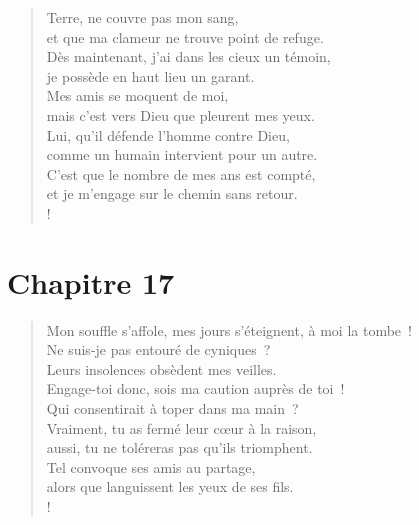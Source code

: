 \documentclass[french,twoside]{book} %
\def\mednobreak{\ifdim\lastskip<\medskipamount
  \removelastskip\nopagebreak\medskip\fi}
\newcommand{\labelblock}[1]{\medbreak{\noindent\color{rubric}\bfseries #1}\par\mednobreak}
\newcommand\chapteropen{} %
\newcommand\chaptercont{} %
\newcommand\chapterclose{} %
\begin{document}
\begin{verse}
Terre, ne couvre pas mon sang, \\
et que ma clameur ne trouve point de refuge.\\
Dès maintenant, j’ai dans les cieux un témoin, \\
je possède en haut lieu un garant.\\
Mes amis se moquent de moi, \\
mais c’est vers Dieu que pleurent mes yeux.\\
Lui, qu’il défende l’homme contre Dieu, \\
comme un humain intervient pour un autre.\\
C’est que le nombre de mes ans est compté, \\
et je m’engage sur le chemin sans retour.\\!
\end{verse}
\chapterclose


\chapteropen
\chapter[Chapitre 17]{Chapitre 17}\renewcommand{\leftmark}{Chapitre 17}


\chaptercont

\begin{verse}
Mon souffle s’affole, mes jours s’éteignent, à moi la tombe !\\
Ne suis-je pas entouré de cyniques ? \\
Leurs insolences obsèdent mes veilles.\\
Engage-toi donc, sois ma caution auprès de toi ! \\
Qui consentirait à toper dans ma main ?\\
Vraiment, tu as fermé leur cœur à la raison, \\
aussi, tu ne toléreras pas qu’ils triomphent.\\
Tel convoque ses amis au partage, \\
alors que languissent les yeux de ses fils.\\!
\end{verse}

\labelblock{La fable des peuples}
\end{document}
